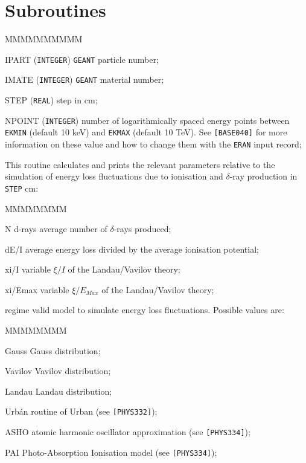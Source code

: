 \section{Subroutines}
\begin{DLtt}{MMMMMMMMMM}
\item[IPART] ({\tt INTEGER}) {\tt GEANT} particle number;
\item[IMATE] ({\tt INTEGER}) {\tt GEANT} material number;
\item[STEP]  ({\tt REAL}) step in cm;
\item[NPOINT] ({\tt INTEGER}) number of logarithmically spaced energy points
between {\tt EKMIN} (default 10 keV) and {\tt EKMAX} (default 10 TeV). See
{\tt [BASE040]} for more information on these value and how to change them
with the {\tt ERAN} input record;
\end{DLtt}

This routine calculates and prints the relevant parameters
relative to the simulation of energy loss fluctuations due to ionisation and
$\delta$-ray production in {\tt STEP} cm:
\begin{DLtt}{MMMMMMMM}
\item[N d-rays] average number of $\delta$-rays produced;
\item[dE/I] average energy loss divided by the
average ionisation potential;
\item[xi/I] variable $\xi/I$ of the Landau/Vavilov
theory;
\item[xi/Emax] variable $\xi/E_{Max}$ of the Landau/Vavilov
theory;
\item[regime] valid model to simulate energy loss fluctuations.
Possible values are:
\begin{DLtt}{MMMMMMMM}
\item[Gauss] Gauss distribution;
\item[Vavilov] Vavilov distribution;
\item[Landau] Landau distribution;
\item[Urb\'{a}n]  routine of Urban (see {\tt [PHYS332]});
\item[ASHO] atomic harmonic oscillator approximation (see {\tt [PHYS334]});
\item[PAI]  Photo-Absorption Ionisation model (see {\tt [PHYS334]});
\end{DLtt}
\end{DLtt}

